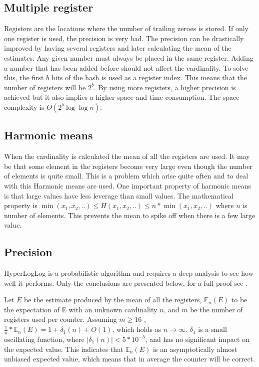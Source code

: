 \subsection{Multiple register}
Registers are the locations where the number of trailing zeroes is stored. If only one register is used, the precision is very bad. The precision can be drastically improved by having several registers and later calculating the mean of the estimates. Any given number must always be placed in the same register. Adding a number that has been added before should not affect the cardinality. To solve this, the first $b$ bits of the hash is used as a register index. This means that the number of registers will be $2^b$. By using more registers, a higher precision is achieved but it also implies a higher space and time consumption. The space complexity is $O(2^b\log\log n)$. \cite{hyperloglog} 

\subsection{Harmonic means}
When the cardinality is calculated the mean of all the registers are used. It may be that some element in the registers become very large even though the number of elements is quite small. This is a problem which arise quite often and to deal with this Harmonic means are used. One important property of harmonic means is that large values have less leverage than small values. The mathematical property is $\min(x_1,x_2,..) \leq H(x_1,x_2,..) \leq n*\min(x_1,x_2,..)$ where $n$ is number of elements. This prevents the mean to spike off when there is a few large value.  

\subsection{Precision}
HyperLogLog is a probabilistic algorithm and requires a deep analysis to see how well it performs. Only the conclusions are presented below, for a full proof see \cite{hyperloglog}. 

Let $E$ be the estimate produced by the mean of all the registers, $\mathbb{E}_n(E)$ to be the expectation of E with an unknown cardinality $n$, and $m$ be the number of registers used per counter. Assuming $m \geq 16$ , $\frac{1}{n}*\mathbb{E}_n(E) = 1 + \delta_1(n) + O(1)$, which holds as $n \rightarrow \infty$. $\delta_1$ is a small oscillating function, where $|\delta_1(n)| < 5*10^{-5}$, and has no significant impact on the expected value. This indicates that $\mathbb{E}_n(E)$ is an asymptotically almost unbiased expected value, which means that in average the counter will be correct. 

